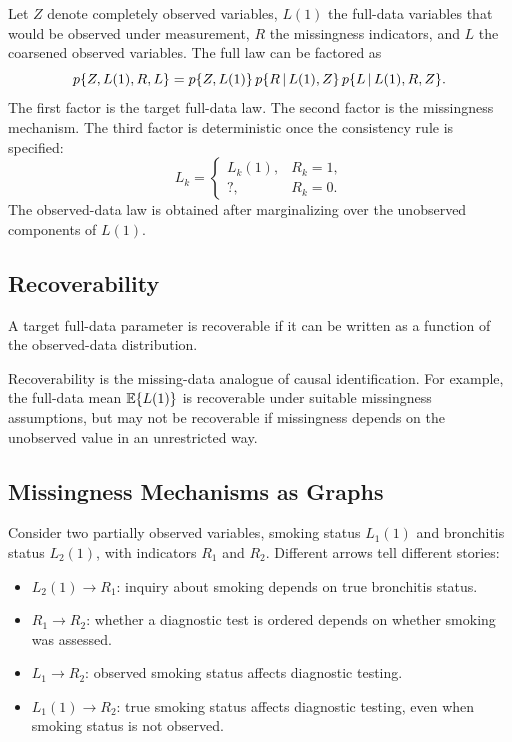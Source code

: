 Let $Z$ denote completely observed variables, $L(1)$ the full-data variables
that would be observed under measurement, $R$ the missingness indicators, and
$L$ the coarsened observed variables. The full law can be factored as
\[
  p\{Z,L(1),R,L\}
  =
  p\{Z,L(1)\}\,
  p\{R\,\vert\, L(1),Z\}\,
  p\{L\,\vert\, L(1),R,Z\}.
\]
The first factor is the target full-data law. The second factor is the
missingness mechanism. The third factor is deterministic once the consistency
rule is specified:
\[
  L_k=
  \begin{cases}
  L_k(1), & R_k=1,\\
  ?, & R_k=0.
  \end{cases}
\]
The observed-data law is obtained after marginalizing over the unobserved
components of $L(1)$.

\subsection{Recoverability}

\begin{definition}[Recoverability]
A target full-data parameter is recoverable if it can be written as a function
of the observed-data distribution.
\end{definition}

Recoverability is the missing-data analogue of causal identification. For
example, the full-data mean $\mathbb{E}\{L(1)\}$ is recoverable under suitable
missingness assumptions, but may not be recoverable if missingness depends on
the unobserved value in an unrestricted way.

\subsection{Missingness Mechanisms as Graphs}

Consider two partially observed variables, smoking status $L_1(1)$ and bronchitis
status $L_2(1)$, with indicators $R_1$ and $R_2$. Different arrows tell different
stories:
\begin{itemize}
  \item $L_2(1)\rightarrow R_1$: inquiry about smoking depends on true
  bronchitis status.
  \item $R_1\rightarrow R_2$: whether a diagnostic test is ordered depends on
  whether smoking was assessed.
  \item $L_1\rightarrow R_2$: observed smoking status affects diagnostic
  testing.
  \item $L_1(1)\rightarrow R_2$: true smoking status affects diagnostic testing,
  even when smoking status is not observed.
\end{itemize}

